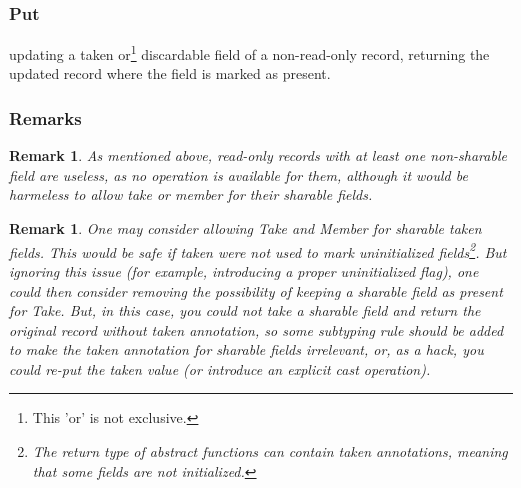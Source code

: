 \documentclass{article}
\newtheorem{remark}[theorem]{Remark}
\begin{document}
    \subsubsection{Put}
    updating a taken or\footnote{This 'or' is not exclusive.} discardable field of a non-read-only record, returning the
      updated record where the field is marked as present. 
      \subsubsection{Remarks}
\begin{remark}
    As mentioned above, read-only records with at least one non-sharable field are useless, as no
    operation is available for them, although it would be harmeless to allow
    take or member for their sharable fields.
  \end{remark}
  \begin{remark}
    One may consider allowing Take and Member for sharable taken fields.
    This would be safe if taken were not used to mark uninitialized
    fields\footnote{%
      The return type of abstract functions can contain taken annotations,
      meaning that some fields are not initialized.
    }.
    But ignoring this issue (for example, introducing a proper uninitialized
    flag),
    one could then consider removing the possibility of keeping a sharable field as present for Take.
   But, in this case, you could not take a sharable field and return the
   original record without taken annotation, so some subtyping rule should be
   added to make the taken annotation for sharable fields irrelevant, or, as a
   hack, you could re-put the taken value (or introduce an explicit cast operation).
  \end{remark}
\end{document}
